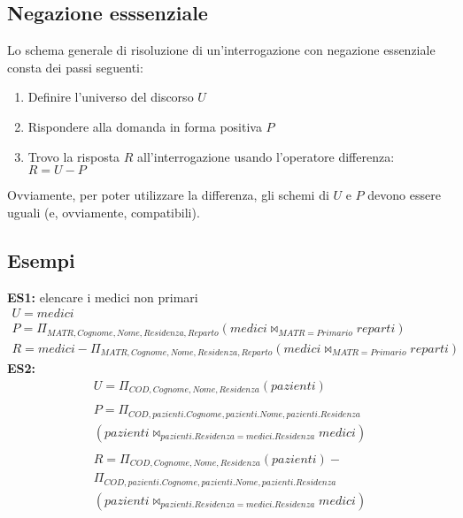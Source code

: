 \subsection{Negazione esssenziale}
Lo schema generale di risoluzione di un'interrogazione con negazione essenziale consta dei passi seguenti:
    \begin{enumerate}
        \item{Definire l'universo del discorso $U$}
        \item{Rispondere alla domanda in forma positiva $P$}
        \item{Trovo la risposta $R$ all'interrogazione usando l'operatore differenza: $R = U-P$}
    \end{enumerate}
Ovviamente, per poter utilizzare la differenza, gli schemi di $U$ e $P$ devono essere uguali (e, ovviamente, compatibili).

\subsection{Esempi}
\textbf{ES1:} elencare i medici non primari
    \begin{equation}\begin{aligned}
        U = medici \\
        P = \Pi_{MATR, Cognome, Nome, Residenza, Reparto} (medici \bowtie_{MATR = Primario} reparti)\\
        R  = medici - \Pi_{MATR, Cognome, Nome, Residenza, Reparto} (medici \bowtie_{MATR = Primario} reparti)
    \end{aligned}\end{equation}
\textbf{ES2:}
    \begin{equation}\begin{aligned}
        U = \Pi_{COD, Cognome, Nome, Residenza}(pazienti)\\\\
        P = \Pi_{COD, pazienti.Cognome, pazienti.Nome,      pazienti.Residenza} \\
        (pazienti \bowtie_{pazienti.Residenza = medici.Residenza} medici)\\\\
        R = \Pi_{COD, Cognome, Nome, Residenza} (pazienti) -\\
        \Pi_{COD, pazienti.Cognome, pazienti.Nome,     pazienti.Residenza}\\
        (pazienti \bowtie_{pazienti.Residenza = medici.Residenza} medici)
    \end{aligned}\end{equation}

